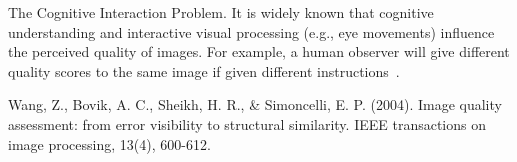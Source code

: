 \documentclass[conference]{IEEEtran}
\begin{document}
The Cognitive Interaction Problem. It is widely known that cognitive
understanding and interactive visual processing (e.g., eye movements) influence
the perceived quality of images. For example, a human observer will give
different quality scores to the same image if given different instructions~\cite{b1}.

\begin{thebibliography}{00}
 Wang, Z., Bovik, A. C., Sheikh, H. R., & Simoncelli, E. P. (2004).
  Image quality assessment: from error visibility to structural similarity. IEEE
  transactions on image processing, 13(4), 600-612.

\end{thebibliography}
\end{document}
